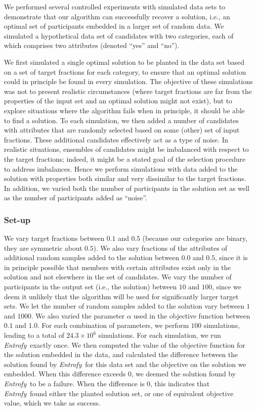 \documentclass[10pt,letterpaper]{article}
\newcommand{\project}[1]{\textsl{#1}}
\newcommand{\entrofy}{\project{Entrofy}}
\begin{document}
We performed several controlled experiments with simulated data sets to demonstrate that our algorithm can successfully recover a solution, i.e., an optimal set of participants embedded in a larger set of random data. We simulated a hypothetical data set of candidates with two categories, each of which comprises two attributes (denoted ``yes'' and ``no'').

We first simulated a single optimal solution to be planted in the data set based on a set of target fractions for each category, to ensure that an optimal solution could in principle be found in every simulation. The objective of these simulations was not to present realistic circumstances (where target fractions are far from the properties of the input set and an optimal solution might not exist), but to explore situations where the algorithm fails when in principle, it should be able to find a solution. To each simulation, we then added a number of candidates with attributes that are randomly selected based on some (other) set of input fractions. These additional candidates effectively act as a type of noise. In realistic situations, ensembles of candidates might be imbalanced with respect to the target fractions; indeed, it might be a stated goal of the selection procedure to address imbalances. Hence we perform simulations with data added to the solution with properties both similar and very dissimilar to the target fractions.
In addition, we varied both the number of participants in the solution set as well as the number of participants added as ``noise''.

\subsubsection*{Set-up}
We vary target fractions between $0.1$ and $0.5$ (because our categories are binary, they are symmetric about $0.5$). We also vary fractions of the attributes of additional random samples added to the solution between $0.0$ and $0.5$, since it is in principle possible that members with certain attributes exist only in the solution and not elsewhere in the set of candidates. We vary the number of participants in the output set (i.e., the solution) between $10$ and $100$, since we deem it unlikely that the algorithm will be used for significantly larger target sets. We let the number of random samples added to the solution vary between $1$ and $1000$. We also varied the parameter $\alpha$ used in the objective function between $0.1$ and $1.0$. For each combination of parameters, we perform $100$ simulations, leading to a total of $24.3 \times 10^{6}$ simulations. 
For each simulation, we run \entrofy\ exactly once. We then computed the value of the objective function for the solution embedded in the data, and calculated the difference between the solution found by \entrofy\ for this data set and the objective on the solution we embedded. When this difference exceeds $0$, we deemed the solution found by \entrofy\ to be a failure.
When the difference is 0, this indicates that \entrofy\ found either the planted solution set, or one of equivalent objective value, which we take as success.
\end{document}

